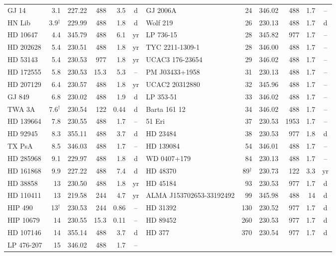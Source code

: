 \begin{tabular}{@{}l@{\hspace{5pt}}r@{\hspace{5pt}}r@{\hspace{5pt}}r@{\hspace{5pt}}r@{\hspace{5pt}}c@{\hspace{12pt}}l@{\hspace{5pt}}r@{\hspace{5pt}}r@{\hspace{5pt}}r@{\hspace{5pt}}r@{\hspace{5pt}}c@{}}
GJ 14 & 3.1 & 227.22 & 488 & 3.5 & d & GJ 2006A & 24 & 346.02 & 488 & 1.7 & -- \\
HN Lib & 3.9$^{\dagger}$ & 229.99 & 488 & 1.8 & d & Wolf 219 & 26 & 230.13 & 488 & 1.7 & d \\
HD 10647 & 4.4 & 345.79 & 488 & 6.1 & yr & LP 736-15 & 28 & 345.82 & 977 & 1.7 & -- \\
HD 202628 & 5.4 & 230.51 & 488 & 1.8 & yr & TYC 2211-1309-1 & 28 & 346.00 & 488 & 1.7 & -- \\
HD 53143 & 5.4 & 230.53 & 977 & 1.8 & yr & UCAC3 176-23654 & 29 & 346.02 & 488 & 1.7 & -- \\
HD 172555 & 5.8 & 230.53 & 15.3 & 5.3 & -- & PM J03433+1958 & 31 & 230.13 & 488 & 1.7 & -- \\
HD 207129 & 6.4 & 230.57 & 488 & 1.8 & yr & UCAC2 20312880 & 32 & 345.96 & 488 & 1.7 & -- \\
GJ 849 & 6.8 & 230.02 & 488 & 1.9 & d & LP 353-51 & 33 & 346.02 & 488 & 1.7 & -- \\
TWA 3A & 7.6$^{\dagger}$ & 230.54 & 122 & 0.44 & d & Barta 161 12 & 34 & 346.02 & 488 & 1.7 & -- \\
HD 139664 & 7.8 & 230.55 & 488 & 1.7 & -- & 51 Eri & 37 & 230.53 & 1953 & 1.7 & -- \\
HD 92945 & 8.3 & 355.11 & 488 & 3.7 & d & HD 23484 & 38 & 230.53 & 977 & 1.8 & d \\
TX PsA & 8.5 & 346.03 & 488 & 1.7 & -- & HD 139084 & 54 & 346.01 & 488 & 1.7 & -- \\
HD 285968 & 9.1 & 229.97 & 488 & 1.8 & d & WD 0407+179 & 84 & 230.13 & 488 & 1.7 & -- \\
HD 161868 & 9.9 & 227.22 & 488 & 7.4 & d & HD 48370 & 89$^{\dagger}$ & 230.73 & 122 & 3.3 & yr \\
HD 38858 & 13 & 230.50 & 488 & 1.8 & yr & HD 45184 & 93 & 230.53 & 977 & 1.7 & d \\
HD 110411 & 13 & 219.58 & 244 & 4.7 & yr & ALMA J153702653-33192492 & 99 & 345.98 & 488 & 14 & d \\
HIP 490 & 13$^{\dagger}$ & 230.53 & 244 & 0.86 & -- & HD 31392 & 130 & 230.52 & 977 & 1.7 & d \\
HIP 10679 & 14 & 230.55 & 15.3 & 0.11 & -- & HD 89452 & 260 & 230.53 & 977 & 1.7 & d \\
HD 107146 & 14 & 355.14 & 488 & 3.7 & d & HD 377 & 370 & 230.54 & 977 & 1.7 & d \\
LP 476-207 & 15 & 346.02 & 488 & 1.7 & -- &  &  &  &  &  &  \\
\hline
\end{tabular}
